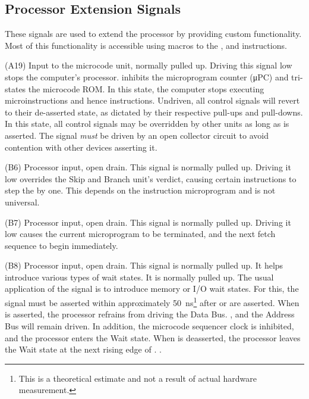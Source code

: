 \subsection{Processor Extension Signals}

These signals are used to extend the processor by providing custom
functionality. Most of this functionality is accessible using macros
to the ,  and  instructions.

\begin{description}
\item{\bfseries \HALT} (A19) Input to the microcode unit, normally pulled up. Driving
  this signal low stops the computer's processor. \HALT{} inhibits the
  microprogram counter (\textsf{μPC}) and tri-states the microcode ROM. In this
  state, the computer stops executing microinstructions and hence
  instructions. Undriven, all control signals will revert to their de-asserted
  state, as dictated by their respective pull-ups and pull-downs. In this
  state, all control signals may be overridden by other units as long as
  \HALT{} is asserted. The \HALT{} signal {\em must\/} be driven by an
  open collector circuit to avoid contention with other devices asserting it.
\item{\bfseries \SKIPEXT} (B6) Processor input, open drain. This signal is normally pulled up. Driving it
  low overrides the Skip and Branch unit's verdict, causing certain
  instructions to step the \PC by one. This depends on the instruction
  microprogram and is not universal.
\item{\bfseries \ENDEXT} (B7) Processor input, open drain. This signal is normally
  pulled up. Driving it low causes the current microprogram to be terminated,
  and the next fetch sequence to begin immediately.
\item{\bfseries \WS} (B8) Processor input, open drain. This signal is normally pulled
  up. It helps introduce various types of wait states. It is normally pulled
  up. The usual application of the \WS{} signal is to introduce memory or I/O
  wait states. For this, the signal must be asserted within approximately
  50~ns\footnote{This is a theoretical estimate and not a result of actual
    hardware measurement.} after \IO{} or \MEM{} are asserted. When \WS{} is
  asserted, the processor refrains from driving the Data Bus. \IO{}, \MEM{} and
  the Address Bus will remain driven. In addition, the microcode sequencer
  clock is inhibited, and the processor enters the Wait state. When \WS{} is
  deasserted, the processor leaves the Wait state at the next rising edge of
  . .


\end{description}


